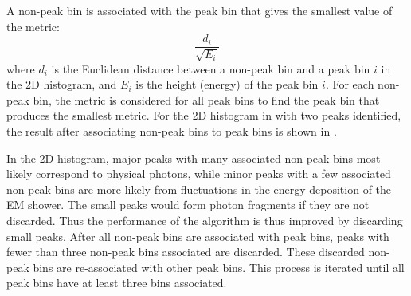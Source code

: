 A non-peak bin is associated with the peak bin that gives the smallest value of the metric:
\begin{equation}
\frac{d_{i}}{\sqrt{E_{i}}}
\end{equation}
where $d_{i}$ is the Euclidean distance between a non-peak bin and a  peak bin $i$ in the 2D histogram, and $E_{i}$ is the height (energy) of the peak bin $i$. For each non-peak bin, the metric is considered for all peak bins to find the peak bin that produces the smallest metric. For the 2D histogram in  with two peaks identified, the result after associating non-peak bins to peak bins is shown in .




In the 2D histogram,  major peaks with many associated non-peak bins most likely correspond to physical photons, while minor peaks with a few associated non-peak bins are more likely from fluctuations in the energy deposition of the EM shower. The small peaks would form photon fragments if they are not discarded.  Thus the performance of the \peakFinding algorithm is thus improved by discarding small peaks.  After all non-peak bins are associated with peak bins, peaks with fewer than three non-peak bins associated are discarded. These discarded non-peak bins are re-associated with other peak bins. This  process is iterated until all peak bins have at least three bins associated.




